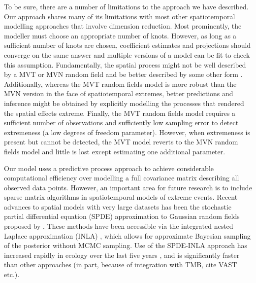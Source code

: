 \documentclass[12pt,english]{article}
\begin{document}
\begin{spacing}{1.3}
To be sure, there are a number of limitations to the approach we have described.
Our approach shares many of its limitations with most other spatiotemporal
modelling approaches that involve dimension reduction. Most prominently, the
modeller must choose an appropriate number of knots. However, as long as a
sufficient number of knots are chosen, coefficient estimates and projections
should converge on the same answer and multiple versions of a model can be fit
to check this assumption. Fundamentally, the spatial process might not be well
described by a MVT or MVN random field and be better described by some other
form \citep[e.g.][]{conn2015}. Additionally, whereas the MVT random fields model
is more robust than the MVN version in the face of spatiotemporal extremes,
better predictions and inference might be obtained by explicitly modelling the
processes that rendered the spatial effects extreme. Finally, the MVT random
fields model requires a sufficient number of observations and sufficiently low
sampling error to detect extremeness (a low degrees of freedom parameter).
However, when extremeness is present but cannot be detected, the MVT model
reverts to the MVN random fields model and little is lost except estimating one
additional parameter.

Our model uses a predictive process approach to achieve considerable
computational efficiency over modelling a full covariance matrix describing all
observed data points. However, an important area for future research is to
include sparse matrix algorithms in spatiotemporal models of extreme events.
Recent advances to spatial models with very large datasets has been the
stochastic partial differential equation (SPDE) approximation to Gaussian random
fields proposed by \citet{lindgren2011}. These methods have been accessible via
the integrated nested Laplace approximation (INLA) \citep{rue2009}, which allows
for approximate Bayesian sampling of the posterior without MCMC sampling. Use of
the SPDE-INLA approach has increased rapidly in ecology over the last five years
\citep[e.g.][]{illian2013, ono2016}, and is significantly faster than other
approaches (in part, because of integration with TMB, cite VAST etc.).



\end{spacing}
\end{document}
